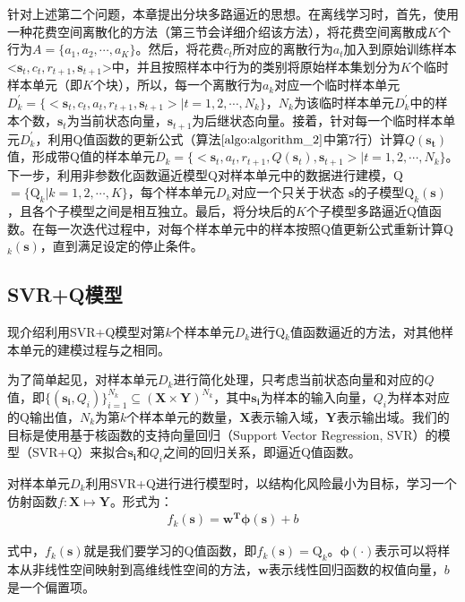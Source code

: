 针对上述第二个问题，本章提出分块多路逼近的思想。在离线学习时，首先，使用一种花费空间离散化的方法（第三节会详细介绍该方法），将花费空间离散成$K$个行为$A=\{a_{1},a_{2},\cdots,a_{K}\}$。然后，将花费$c_{t}$所对应的离散行为$a_{t}$加入到原始训练样本<$\mathbf{s}_{t},c_{t},r_{t+1},\mathbf{s}_{t+1}$>中，并且按照样本中行为的类别将原始样本集划分为$K$个临时样本单元（即$K$个块），所以，每一个离散行为$a_{k}$对应一个临时样本单元$D_{k}^{'}=\{<\mathbf{s}_{t},c_{t},a_{t},r_{t+1},\mathbf{s}_{t+1}>|t=1,2,\cdots,N_{k}\}$，$N_{k}$为该临时样本单元$D_{k}^{'}$中的样本个数，$\mathbf{s}_{t}$为当前状态向量，$\mathbf{s}_{t+1}$为后继状态向量。接着，针对每一个临时样本单元$D_{k}^{'}$，利用Q值函数的更新公式（算法$\ref{algo:algorithm_2}$中第7行）计算$Q(\mathbf{s_{t}})$值，形成带Q值的样本单元$D_{k}=\{<\mathbf{s}_{t},a_{t},r_{t+1},Q(\mathbf{s}_{t}),\mathbf{s}_{t+1}>|t=1,2,\cdots,N_{k}\}$。下一步，利用非参数化函数逼近模型Q对样本单元中的数据进行建模，Q$=\{\text{Q}_{k}|k=1,2,\cdots,K\}$，每个样本单元$D_{k}$对应一个只关于状态 $\mathbf{s}$的子模型$\text{Q}_{k}(\mathbf{s})$，且各个子模型之间是相互独立。最后，将分块后的$K$个子模型多路逼近Q值函数。在每一次迭代过程中，对每个样本单元中的样本按照Q值更新公式重新计算Q$_{k}(\mathbf{s})$，直到满足设定的停止条件。

\subsection{SVR+Q模型}
现介绍利用SVR+Q模型对第$k$个样本单元$D_{k}$进行Q$_{k}$值函数逼近的方法，对其他样本单元的建模过程与之相同。

为了简单起见，对样本单元$D_{k}$进行简化处理，只考虑当前状态向量和对应的$Q$值，即$\{(\mathbf{s_{i}}, Q_{i})\}_{i=1}^{N_{k}}\subseteq(\mathbf{X} \times \mathbf{Y})^{N_{k}}$，其中$\mathbf{s_{i}}$为样本的输入向量，$Q_{i}$为样本对应的Q输出值，$N_{k}$为第$k$个样本单元的数量，$\mathbf{X}$表示输入域，$\mathbf{Y}$表示输出域。我们的目标是使用基于核函数的支持向量回归（Support Vector Regression, SVR）的模型（SVR+Q）来拟合$\mathbf{s_{i}}$和$Q_{i}$之间的回归关系，即逼近Q值函数。

对样本单元$D_{k}$利用SVR+Q进行进行模型时，以结构化风险最小为目标，学习一个仿射函数$f:\mathbf{X} \mapsto \mathbf{Y}$。形式为：
\begin{equation}
\begin{aligned}
f_{k}(\mathbf{s})=\mathbf{w^{T}} \bm{\phi(s)} + b
\end{aligned}
\end{equation}

式中，$f_{k}(\mathbf{s})$就是我们要学习的Q值函数，即$f_{k}(\mathbf{s}) = \text{Q}_{k}$。$\bm{\phi(\cdot)}$表示可以将样本从非线性空间映射到高维线性空间的方法，$\mathbf{w}$表示线性回归函数的权值向量，$b$是一个偏置项。

